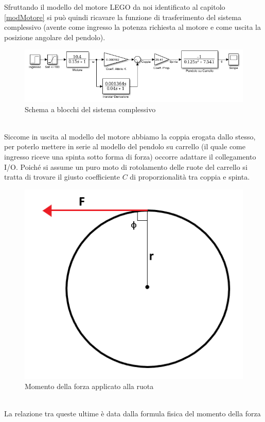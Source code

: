 Sfruttando il modello del motore LEGO da noi identificato al capitolo \ref{modMotore} si può quindi ricavare la funzione di trasferimento del sistema complessivo (avente come ingresso la potenza richiesta al motore e come uscita la posizione angolare del pendolo).\begin{figure}[ht]
	\centering
	\includegraphics[width=\textwidth]{SisComplessivoPendoloNormale.PNG}
	\caption{Schema a blocchi del sistema complessivo}
	\label{SisComplessivoPendoloNormale}
\end{figure}
\\Siccome in uscita al modello del motore abbiamo la coppia erogata dallo stesso, per poterlo mettere in serie al modello del pendolo su carrello (il quale come ingresso riceve una spinta sotto forma di forza) occorre adattare il collegamento I/O. Poiché si assume un puro moto di rotolamento delle ruote del carrello si tratta di trovare il giusto coefficiente $C$ di proporzionalità tra coppia e spinta.
\begin{figure}[ht]
	\centering
	\includegraphics[scale=0.55]{braccioForza.PNG}
	\caption{Momento della forza applicato alla ruota}
	\label{braccioForza}
\end{figure}
\\La relazione tra queste ultime è data dalla formula fisica del momento della forza

